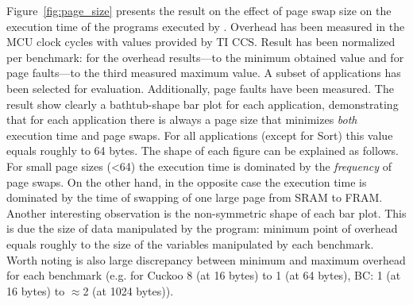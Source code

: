Figure~\ref{fig:page_size} presents the result on the effect of page swap size on the execution time of the programs executed by \sys. Overhead has been measured in the MCU clock cycles with values provided by TI CCS. Result has been normalized per benchmark: for the overhead results---to the minimum obtained value and for page faults---to the third measured maximum value. A subset of applications has been selected for evaluation. Additionally, page faults have been measured. The result show clearly a bathtub-shape bar plot for each application, demonstrating that for each application there is always a page size that minimizes \emph{both} execution time and page swaps. For all applications (except for Sort) this value equals roughly to 64 bytes. The shape of each figure can be explained as follows. For small page sizes (<64) the execution time is dominated by the \emph{frequency} of page swaps. On the other hand, in the opposite case the execution time is dominated by the time of swapping of one large page from SRAM to FRAM. Another interesting observation is the non-symmetric shape of each bar plot. This is due the size of data manipulated by the program: minimum point of overhead equals roughly to the size of the variables manipulated by each benchmark. Worth noting is also large discrepancy between minimum and maximum overhead for each benchmark (e.g. for Cuckoo 8 (at 16 bytes) to 1 (at 64 bytes), BC: 1 (at 16 bytes) to $\approx$2 (at 1024 bytes)).




